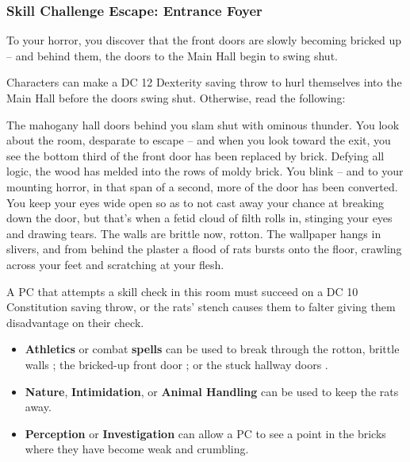 \subsubsection*{Skill Challenge Escape: Entrance Foyer}
\label{sec:SC_EntranceFoyer}
\begin{readout}
  To your horror, you discover that the front doors are slowly becoming bricked up -- and behind them, the doors 
  to the Main Hall begin to swing shut.
\end{readout}
Characters can make a DC 12 Dexterity saving throw to hurl themselves into the Main Hall before the doors swing 
shut. Otherwise, read the following:
\begin{readout}
  The mahogany hall doors behind you slam shut with ominous thunder. You look about the room, desparate to escape
  -- and when you look toward the exit, you see the bottom third of the front door has been replaced by brick.
  Defying all logic, the wood has melded into the rows of moldy brick. You blink -- and to your mounting horror,
  in that span of a second, more of the door has been converted. You keep your eyes wide open so as to not cast
  away your chance at breaking down the door, but that's when a fetid cloud of filth rolls in, stinging your
  eyes and drawing tears. The walls are brittle now, rotton. The wallpaper hangs in slivers, and from behind
  the plaster a flood of rats bursts onto the floor, crawling across your feet and scratching at your flesh.
\end{readout}
A PC that attempts a skill check in this room must succeed on a DC 10 Constitution saving throw, or the rats'
stench causes them to falter giving them disadvantage on their check.
\begin{skillChallenge}
  \begin{itemize}
    \item \textbf{Athletics} or combat \textbf{spells} can be used to break through the rotton, brittle walls
    \easyDC; the bricked-up front door \hardDC; or the stuck hallway doors \moderateDC.
    \item \textbf{Nature}, \textbf{Intimidation}, or \textbf{Animal Handling} can be used to keep the rats away.
    \moderateDC
    \item \textbf{Perception} or \textbf{Investigation} can allow a PC to see a point in the bricks where they
    have become weak and crumbling. \moderateDC
  \end{itemize}
\end{skillChallenge}

